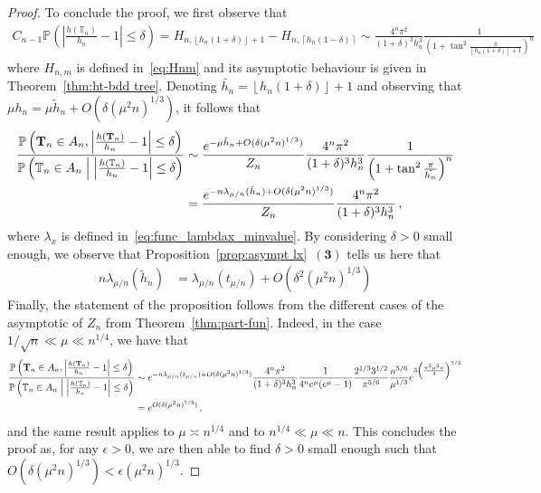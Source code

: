 \documentclass{article}
\newcommand{\pr}{\mathbb{P}}								%
\newcommand{\Prob}[1]{\pr\left(#1\right)}					%
\newcommand{\CProb}[2]{\pr\left(#1 \Bigm| #2\right)}	%
\newcommand{\1}{\mathbbm{1}}								%
\theoremstyle{definition}
\numberwithin{equation}{section}
\newcommand{\bT}{\mathbf T}
\newcommand{\T}{\mathbb T}
\newcommand{\floor}[1]{\left\lfloor #1\right\rfloor}
\newcommand{\ceil}[1]{\left\lceil #1 \right\rceil}
\newcommand{\numitem}[1]{$\mathbf{(#1)}$}
\begin{document}
\begin{proof}
    To conclude the proof, we first observe that
    \begin{align*}
        C_{n-1}\Prob{\left|\frac{h(\T_n)}{h_n}-1\right|\leq\delta}=H_{n,\floor{h_n(1+\delta)}+1}-H_{n,\ceil{h_n(1-\delta)}}\sim\frac{4^n\pi^2}{(1+\delta)^3h_n^3}\frac{1}{\left(1+\tan^2\frac{\pi}{\floor{h_n(1+\delta)}+1}\right)^n}
    \end{align*}
    where $H_{n,m}$ is defined in~\eqref{eq:Hnm} and its asymptotic behaviour is given in Theorem~\ref{thm:ht-bdd tree}.
    Denoting $\tilde{h_n}=\floor{h_n(1+\delta)}+1$ and observing that $\mu h_n=\mu\tilde{h}_n+O(\delta(\mu^2n)^{1/3})$, it follows that
    \begin{align*}
        \frac{\Prob{\bT_n\in A_n,\left|\frac{h(\bT_n)}{h_n}-1\right|\leq\delta}}{\CProb{\T_n\in A_n}{\left|\frac{h(\T_n)}{h_n}-1\right|\leq\delta}}
        &\sim\frac{e^{-\mu\tilde{h}_n+O(\delta(\mu^2n)^{1/3})}}{Z_n}\frac{4^n\pi^2}{(1+\delta)^3h_n^3}\frac{1}{\left(1+\tan^2\frac{\pi}{\tilde{h_n}}\right)^n}\\
        &=\frac{e^{-n\lambda_{\mu/n}(\tilde{h}_n)+O(\delta(\mu^2n)^{1/3})}}{Z_n}\frac{4^n\pi^2}{(1+\delta)^3h_n^3}\,,
    \end{align*}
    where $\lambda_x$ is defined in~\eqref{eq:func_lambdax_minvalue}.
    By considering $\delta>0$ small enough, we observe that Proposition~\ref{prop:asympt lx}~\numitem{3} tells us here that
    \begin{align*}
        n\lambda_{\mu/n}(\tilde{h}_n)&=\lambda_{\mu/n}(t_{\mu/n})+O\left(\delta^2(\mu^2n)^{1/3}\right)
    \end{align*}
    Finally, the statement of the proposition follows from the different cases of the asymptotic of $Z_n$ from Theorem~\ref{thm:part-fun}.
    Indeed, in the case $1/\sqrt{n}\ll\mu\ll n^{1/4}$, we have that
    \begin{align*}
        \frac{\Prob{\bT_n\in A_n,\left|\frac{h(\bT_n)}{h_n}-1\right|\leq\delta}}{\CProb{\T_n\in A_n}{\left|\frac{h(\T_n)}{h_n}-1\right|\leq\delta}}
        &\sim e^{-n\lambda_{\mu/n}(t_{\mu/n})+O(\delta(\mu^2n)^{1/3})}\frac{4^n\pi^2}{(1+\delta)^3h_n^3}\frac{1}{4^ne^\mu(e^\mu-1)}\frac{2^{1/3}3^{1/2}}{\pi^{5/6}}\frac{n^{5/6}}{\mu^{1/3}}e^{3\left(\frac{\pi^2\mu^2n}{4}\right)^{1/3}}\\
        &=e^{O(\delta(\mu^2n)^{1/3})}\,,
    \end{align*}
    and the same result applies to $\mu\asymp n^{1/4}$ and to $n^{1/4}\ll\mu\ll n$.
    This concludes the proof as, for any $\epsilon>0$, we are then able to find $\delta>0$ small enough such that $O(\delta(\mu^2n)^{1/3})<\epsilon(\mu^2n)^{1/3}$.
\end{proof}
\end{document}
